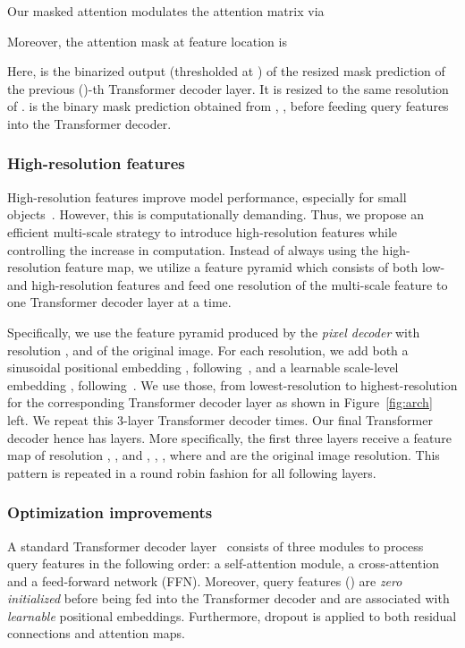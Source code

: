 \documentclass[10pt,twocolumn,letterpaper]{article}
\newcommand{\figref}[1]{Figure~\ref{#1}}
\begin{document}
Our masked attention modulates the attention matrix via

Moreover, the attention mask  at feature location  is

Here,  is the binarized output (thresholded at ) of the resized mask prediction of the previous ()-th Transformer decoder layer. It is resized to the same resolution of .  is the binary mask prediction obtained from  , \ie, before feeding query features into the Transformer decoder.

















\vspace{-2mm}
\subsubsection{High-resolution features}
\label{sec:method:arch:transformer_decoder:ms_feat}


High-resolution features improve model performance, especially for small objects~\cite{detr}. However, this is computationally demanding. Thus, we propose an efficient multi-scale strategy to introduce high-resolution features while controlling the increase in computation. Instead of always using the high-resolution feature map, we utilize a feature pyramid which consists of both low- and high-resolution features and feed one resolution of the multi-scale feature to one Transformer decoder layer at a time.

Specifically, we use the feature pyramid produced by the \emph{pixel decoder} with resolution ,  and  of the original image. For each resolution, we add both a sinusoidal positional embedding , following~\cite{detr}, and a learnable scale-level embedding , following~\cite{zhu2021deformable}. We use those, from lowest-resolution to highest-resolution for the corresponding Transformer decoder layer as shown in \figref{fig:arch} left. We repeat this 3-layer Transformer decoder   times.  Our final Transformer decoder hence has  layers. More specifically, the first three layers receive a feature map of resolution , ,  and , , , where  and  are the original image resolution. This pattern is repeated in a round robin fashion for all following layers.

\subsubsection{Optimization improvements}
\label{sec:method:arch:transformer_decoder:other}
A standard Transformer decoder layer~\cite{vaswani2017attention} consists of three modules to process query features in the following order: a self-attention module, a cross-attention and a feed-forward network (FFN). Moreover, query features () are \emph{zero initialized} before being fed into the Transformer decoder and are associated with \emph{learnable} positional embeddings. Furthermore, dropout is applied to both residual connections and attention maps.
\end{document}
